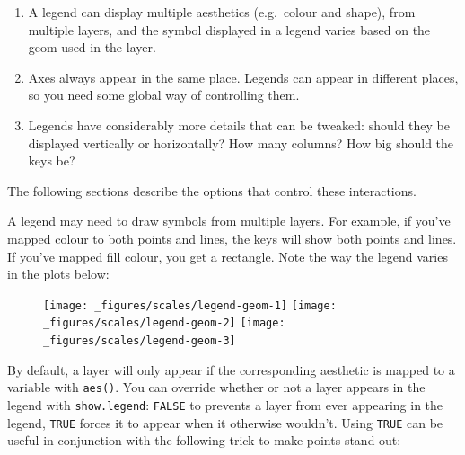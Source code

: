 \begin{enumerate}
\def\labelenumi{\arabic{enumi}.}
\item
  A legend can display multiple aesthetics (e.g.~colour and shape), from
  multiple layers, and the symbol displayed in a legend varies based on
  the geom used in the layer.
\item
  Axes always appear in the same place. Legends can appear in different
  places, so you need some global way of controlling them.
\item
  Legends have considerably more details that can be tweaked: should
  they be displayed vertically or horizontally? How many columns? How
  big should the keys be?
\end{enumerate}

The following sections describe the options that control these
interactions.


A legend may need to draw symbols from multiple layers. For example, if
you've mapped colour to both points and lines, the keys will show both
points and lines. If you've mapped fill colour, you get a rectangle.
Note the way the legend varies in the plots below:

\begin{figure}[H]
  \texttt{[image: \_figures/scales/legend-geom-1]}%
  \texttt{[image: \_figures/scales/legend-geom-2]}%
  \texttt{[image: \_figures/scales/legend-geom-3]}
\end{figure}

By default, a layer will only appear if the corresponding aesthetic is
mapped to a variable with \texttt{aes()}. You can override whether or
not a layer appears in the legend with \texttt{show.legend}:
\texttt{FALSE} to prevents a layer from ever appearing in the legend,
\texttt{TRUE} forces it to appear when it otherwise wouldn't. Using
\texttt{TRUE} can be useful in conjunction with the following trick to
make points stand out:

